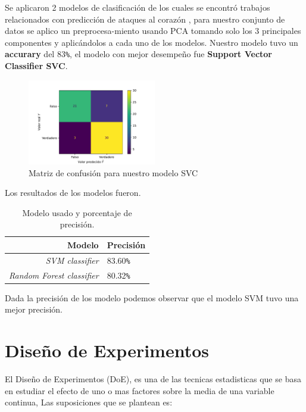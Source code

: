 \documentclass[10pt,journal]{IEEEtran}
\begin{document}
Se aplicaron 2 modelos de clasificación de los cuales se encontró trabajos relacionados con predicción de ataques al corazón \cite{Pal_2021} \cite{8684835}, para nuestro conjunto de datos se aplico un preprocesa-miento usando PCA tomando solo los 3 principales componentes y aplicándolos a cada uno de los modelos. Nuestro modelo tuvo un \textbf{accurary} del 83\verb|%|, el modelo con mejor desempeño fue \textbf{Support Vector Classifier SVC}.

\begin{figure}[ht]
    \centering
    \includegraphics[width=0.5\textwidth,height=0.5\textheight,keepaspectratio]{cfm.pdf}
    \caption{ Matriz de confusión para nuestro modelo SVC} 
    \label{fig:fcm_matriz}
\end{figure}


Los resultados de los modelos fueron.

\begin{table}[th]
    \caption{Modelo usado y porcentaje de precisión.}
    \label{tab:ts_example}
    \begin{center}
    \begin{tabular}{|r|l|}
    \hline
       Modelo & Precisión  \\
   \hline
    \emph{SVM classifier} &  83.60\verb|%|  \\

    \hline
    \emph{Random Forest classifier} &  80.32\verb|%|  \\
   \hline
    \end{tabular}
    \end{center}
\end{table}

Dada la precisión de los modelo podemos observar que el modelo SVM tuvo una mejor precisión.

\section{Diseño de Experimentos}

El Diseño de Experimentos (DoE), es una de las tecnicas estadisticas que se basa en estudiar el efecto de uno o mas factores sobre la media de una variable continua, Las suposiciones que se plantean es:
\end{document}
